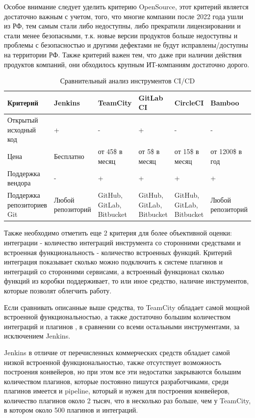 Особое внимание следует уделить критерию OpenSource, этот критерий является достаточно важным с учетом, того, что многие компании после 2022 года ушли из РФ, тем самым стали либо недоступны, либо прекратили лицензировании и стали менее безопасными, т.к. новые версии продуктов больше недоступны и проблемы с безопасностью и другими дефектами не будут исправлены/доступны на территории РФ. Также критерий важен тем, что даже при наличии действия продуктов компаний, они обходилось крупным ИТ-компаниям достаточно дорого.

\begin{table}
    \centering
    \caption{Сравнительный анализ инструментов CI/CD}
    \begin{tabular}{|p{3cm}|p{2cm}|p{2cm}|p{2cm}|p{2cm}|p{2cm}|}
    \hline
        Критерий & Jenkins & TeamCity & GitLab CI & CircleCI & Bamboo \\ \hline
        Открытый исходный код & + & - & + & - & - \\ \hline
        Цена & Бесплатно & от 45\$ в месяц & от 5\$ в месяц & от 15\$ в месяц & от 1200\$ в год \\ \hline
        Поддержка вендора & - & + & + &+ & + \\ \hline
        Поддержка репозиториев Git & Любой репозиторий & GitHub, GitLab, Bitbucket & GitHub, GitLab, Bitbucket  & GitHub, GitLab, Bitbucket & Любой репозиторий  \\ \hline

    \end{tabular}
\end{table}	

Также необходимо отметить еще 2 критерия для более объективной оценки: интеграции - количество интеграций инструмента со сторонними средствами и встроенная функциональность - количество встроенных функций.
Критерий интеграция показывает сколько можно подключить к системе плагинов и интеграций со сторонними сервисами, а встроенный функционал сколько функций из коробки поддерживает, то или иное средство, наличие инструментов, которые позволят облегчить работу.

Если сравнивать описанные выше средства, то TeamCity обладает самой мощной встроенной функциональностью, а также достаточно большим количеством интеграций и плагинов \cite{cianalyze}, в сравнении со всеми остальными инструментами, за исключением Jenkins.

Jenkins в отличие от перечисленных коммерческих средств обладает самой низкой встроенной функциональностью, также отсутствует возможность построения конвейеров, но при этом все эти недостатки закрываются большим количеством плагинов, которые постоянно пишутся разработчиками, среди плагинов имеется и pipeline, который и нужен для построения конвейеров, количество плагинов около 2 тысяч, что в несколько раз больше, чем у TeamCity, в котором около 500 плагинов и интеграций.

